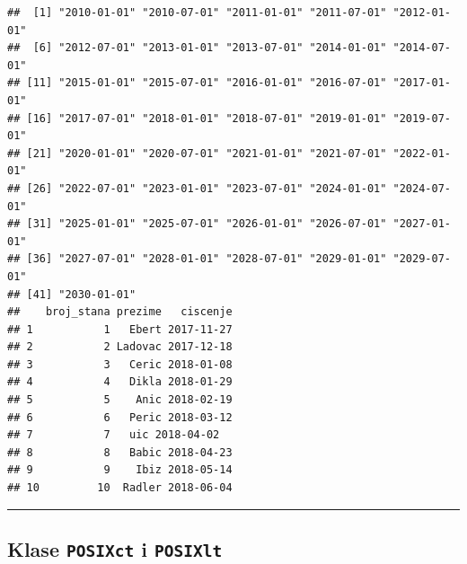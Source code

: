 \documentclass[]{book}
\newenvironment{Shaded}{\begin{snugshade}}{\end{snugshade}}
\newcommand{\KeywordTok}[1]{\textcolor[rgb]{0.13,0.29,0.53}{\textbf{#1}}}
\newcommand{\DataTypeTok}[1]{\textcolor[rgb]{0.13,0.29,0.53}{#1}}
\newcommand{\StringTok}[1]{\textcolor[rgb]{0.31,0.60,0.02}{#1}}
\newcommand{\OperatorTok}[1]{\textcolor[rgb]{0.81,0.36,0.00}{\textbf{#1}}}
\newcommand{\NormalTok}[1]{#1}
\theoremstyle{definition}
\theoremstyle{definition}
\theoremstyle{definition}
\theoremstyle{remark}
\begin{document}
\begin{Shaded}
\end{Shaded}

\begin{verbatim}
##  [1] "2010-01-01" "2010-07-01" "2011-01-01" "2011-07-01" "2012-01-01"
##  [6] "2012-07-01" "2013-01-01" "2013-07-01" "2014-01-01" "2014-07-01"
## [11] "2015-01-01" "2015-07-01" "2016-01-01" "2016-07-01" "2017-01-01"
## [16] "2017-07-01" "2018-01-01" "2018-07-01" "2019-01-01" "2019-07-01"
## [21] "2020-01-01" "2020-07-01" "2021-01-01" "2021-07-01" "2022-01-01"
## [26] "2022-07-01" "2023-01-01" "2023-07-01" "2024-01-01" "2024-07-01"
## [31] "2025-01-01" "2025-07-01" "2026-01-01" "2026-07-01" "2027-01-01"
## [36] "2027-07-01" "2028-01-01" "2028-07-01" "2029-01-01" "2029-07-01"
## [41] "2030-01-01"
##    broj_stana prezime   ciscenje
## 1           1   Ebert 2017-11-27
## 2           2 Ladovac 2017-12-18
## 3           3   Ceric 2018-01-08
## 4           4   Dikla 2018-01-29
## 5           5    Anic 2018-02-19
## 6           6   Peric 2018-03-12
## 7           7   uic 2018-04-02
## 8           8   Babic 2018-04-23
## 9           9    Ibiz 2018-05-14
## 10         10  Radler 2018-06-04
\end{verbatim}

\begin{center}\rule{0.5\linewidth}{\linethickness}\end{center}

\subsection{\texorpdfstring{Klase \texttt{POSIXct} i
\texttt{POSIXlt}}{Klase POSIXct i POSIXlt}}\label{klase-posixct-i-posixlt}
\end{document}
